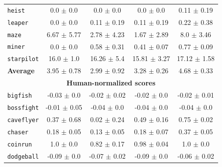 \begin{table}[h]
\begin{tabular}{@{} l c c c c@{}}
    \texttt{heist}      &                    0.0 $\pm$ 0.0 &                     0.0 $\pm$ 0.0 &                     0.0 $\pm$ 0.0 &             0.11 $\pm$ 0.19 \\
    \texttt{leaper}     &                    0.0 $\pm$ 0.0 &                   0.11 $\pm$ 0.19 &                   0.11 $\pm$ 0.19 &             0.22 $\pm$ 0.38 \\
    \texttt{maze}       &                  6.67 $\pm$ 5.77 &                   2.78 $\pm$ 4.23 &                   1.67 $\pm$ 2.89 &              8.0 $\pm$ 3.46 \\
    \texttt{miner}     &                    0.0 $\pm$ 0.0 &                   0.58 $\pm$ 0.31 &                   0.41 $\pm$ 0.07 &             0.77 $\pm$ 0.09 \\
    \texttt{starpilot} &                   16.0 $\pm$ 1.0 &                   16.26 $\pm$ 5.4 &                  15.81 $\pm$ 3.27 &            17.12 $\pm$ 1.58 \\
    \textbf{Average}              &                  3.95 $\pm$ 0.78 &                   2.99 $\pm$ 0.92 &                   3.28 $\pm$ 0.26 &             4.68 $\pm$ 0.33 \\
    \midrule
    \multicolumn{5}{c}{\textbf{Human-normalized scores}} \\ 
    \texttt{bigfish}            &                  -0.03 $\pm$ 0.0 &                  -0.02 $\pm$ 0.02 &                   -0.02 $\pm$ 0.0 &            -0.02 $\pm$ 0.01 \\
    \texttt{bossfight}          &                 -0.01 $\pm$ 0.05 &                   -0.04 $\pm$ 0.0 &                   -0.04 $\pm$ 0.0 &             -0.04 $\pm$ 0.0 \\
    \texttt{caveflyer}          &                  0.37 $\pm$ 0.68 &                   0.02 $\pm$ 0.24 &                   0.49 $\pm$ 0.16 &             0.75 $\pm$ 0.02 \\
    \texttt{chaser}             &                  0.18 $\pm$ 0.05 &                   0.13 $\pm$ 0.05 &                   0.18 $\pm$ 0.07 &             0.37 $\pm$ 0.05 \\
    \texttt{coinrun}            &                    1.0 $\pm$ 0.0 &                   0.82 $\pm$ 0.17 &                   0.98 $\pm$ 0.04 &               1.0 $\pm$ 0.0 \\
    \texttt{dodgeball}          &                  -0.09 $\pm$ 0.0 &                  -0.07 $\pm$ 0.02 &                   -0.09 $\pm$ 0.0 &            -0.06 $\pm$ 0.02 \\

\end{tabular}
\end{table}

